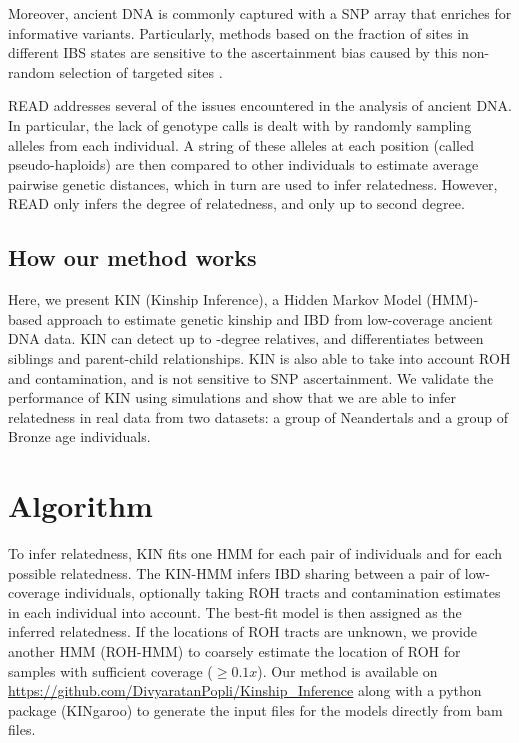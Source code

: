 \documentclass[12pt, letterpaper]{article}
\begin{document}
Moreover, ancient DNA is commonly captured with a SNP array that enriches for informative variants. Particularly, methods based on the fraction of sites in different IBS states are sensitive to the ascertainment bias caused by this non-random selection of targeted sites \cite{waples_allele_2019}. 

READ \cite{kuhn_estimating_2018} addresses several of the issues encountered in the analysis of ancient DNA. In particular, the lack of genotype calls is dealt with by randomly sampling alleles from each individual. A string of these alleles at each position (called pseudo-haploids) are then compared to other individuals to estimate  average pairwise genetic distances, which in turn are used to infer relatedness. However, READ only infers the degree of relatedness, and only up to second degree.

\subsection{How our method works}
Here, we present KIN (Kinship Inference), a Hidden Markov Model (HMM)-based approach to estimate genetic kinship and IBD from low-coverage ancient DNA data. KIN can detect up to -degree relatives, and differentiates between siblings and parent-child relationships. KIN is also able to take into account ROH and contamination, and is not sensitive to SNP ascertainment. We validate the performance of KIN using simulations and show that we are able to infer relatedness in real data from two datasets: a group of Neandertals and a group of Bronze age individuals.


\section{Algorithm}\label{new_approaches}
To infer relatedness, KIN fits one HMM for each pair of individuals and for each possible relatedness. The KIN-HMM infers IBD sharing between a pair of low-coverage individuals, optionally taking ROH tracts and contamination estimates in each individual into account. The best-fit model is then assigned as the inferred relatedness. If the locations of ROH tracts are unknown, we provide another HMM (ROH-HMM) to coarsely estimate the location of ROH for samples with sufficient coverage ($\geq 0.1x$). Our method is available on \url{https://github.com/DivyaratanPopli/Kinship_Inference} along with a python package (KINgaroo) to generate the input files for the models directly from bam files. 
\end{document}
